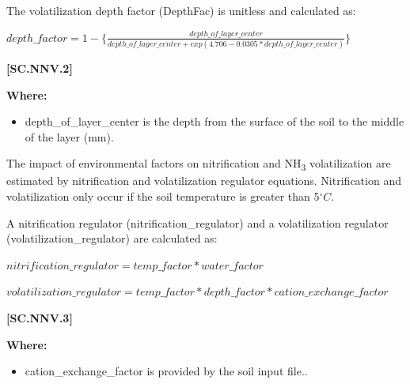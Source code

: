 The volatilization depth factor (DepthFac) is unitless and calculated as:
\vspace{0.5cm}
            
    \begin{center}
 \(depth\_factor=1-\{\frac{depth\_of\_layer\_center}{depth\_of\_layer\_center+exp(4.706-0.0305 * depth\_of\_layer\_center)}\}\)
    \end{center}
        \vspace{0.5cm} 
    
            {\raggedleft \textbf{[SC.NNV.2]}\par}
            \vspace{0.5cm}

        \textbf{Where:}
            
        \begin{itemize}
            \item depth\_of\_layer\_center is the depth from the surface of the soil to the middle of the layer (mm).
        \end{itemize}
    \vspace{0.5cm}

The impact of environmental factors on nitrification and NH\textsubscript{3} volatilization are estimated by nitrification and volatilization regulator equations. Nitrification and volatilization only occur if the soil temperature is greater than 5\(^\circ C\).
\vspace{0.5cm}

A nitrification regulator (nitrification\_regulator) and a volatilization regulator (volatilization\_regulator) are calculated as:
\vspace{0.5cm}
            
    \begin{center}
 \(nitrification\_regulator=temp\_factor * water\_factor \)
 \vspace{0.1cm}

  \(volatilization\_regulator=temp\_factor * depth\_factor * cation\_exchange\_factor\)
    \end{center}
        \vspace{0.5cm} 
    
            {\raggedleft \textbf{[SC.NNV.3]}\par}
            \vspace{0.5cm}

        \textbf{Where:}
            
        \begin{itemize}
            \item cation\_exchange\_factor is provided by the soil input file..
        \end{itemize}
    \vspace{0.5cm}

